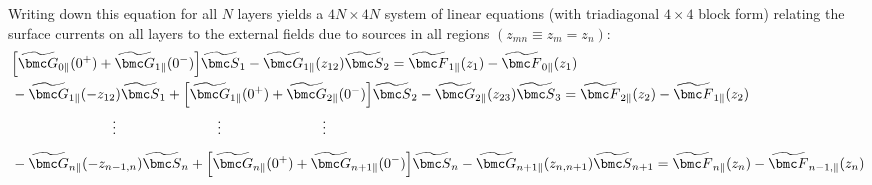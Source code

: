 \documentclass[letterpaper]{article}
\renewcommand{\wt}{\widetilde}
\begin{document}
Writing down this equation for all $N$ layers yields a $4N\times 4N$ 
system of linear equations (with triadiagonal $4\times 4$ block form)
relating the surface currents on all layers
to the external fields due to sources in all regions
$(z_{mn}\equiv z_m=z_n)$:
\begin{subequations}
\begin{align}
&
 \Big[ \wt{\bmc G}_{0\parallel}(0^+)
      +\wt{\bmc G}_{1\parallel}(0^-)
 \Big]\wt{\bmc S}_1
 -\wt{\bmc G}_{1\parallel}(z_{12})\wt{\bmc S}_2
   = \wt{\bmc F}_{1\parallel}(z_1) - \wt{\bmc F}_{0\parallel}(z_1)
\\
&
 -\wt{\bmc G}_{1\parallel}(-z_{12})\wt{\bmc S}_1
 + \Big[ \wt{\bmc G}_{1\parallel}(0^+)
        +\wt{\bmc G}_{2\parallel}(0^-)
   \Big]\wt{\bmc S}_2
 -\wt{\bmc G}_{2\parallel}(z_{23})\wt{\bmc S}_3
   = \wt{\bmc F}_{2 \parallel}(z_2) - \wt{\bmc F}_{1\parallel}(z_2)
\\
&\hspace{1in}\vdots \hspace{1in} \vdots \hspace{1in} \vdots \hspace{1in}
\nonumber\\[5pt]
&
 -\wt{\bmc G}_{n\parallel}(-z_{n-1,n})\wt{\bmc S}_n
 + \Big[ \wt{\bmc G}_{n\parallel}(0^+)
        +\wt{\bmc G}_{n+1\parallel}(0^-)
   \Big]\wt{\bmc S}_n
 -\wt{\bmc G}_{n+1\parallel}(z_{n,n+1})\wt{\bmc S}_{n+1}
   = \wt{\bmc F}_{n \parallel}(z_n) - \wt{\bmc F}_{n-1,\parallel}(z_n)
\end{align}
\label{MatchingConditions}
\end{subequations}
\end{document}
